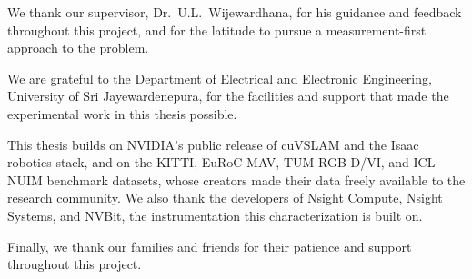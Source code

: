 We thank our supervisor, Dr.~U.L.~Wijewardhana, for his guidance and feedback throughout this project, and for the latitude to pursue a measurement-first approach to the problem.

We are grateful to the Department of Electrical and Electronic Engineering, University of Sri Jayewardenepura, for the facilities and support that made the experimental work in this thesis possible.

This thesis builds on NVIDIA's public release of cuVSLAM and the Isaac robotics stack, and on the KITTI, EuRoC MAV, TUM RGB-D/VI, and ICL-NUIM benchmark datasets, whose creators made their data freely available to the research community. We also thank the developers of Nsight Compute, Nsight Systems, and NVBit, the instrumentation this characterization is built on.

Finally, we thank our families and friends for their patience and support throughout this project.
